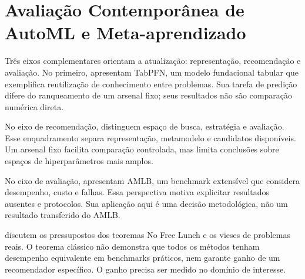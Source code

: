 \section{Avaliação Contemporânea de AutoML e Meta-aprendizado}

Três eixos complementares orientam a atualização: representação, recomendação e avaliação. No primeiro,  apresentam TabPFN, um modelo fundacional tabular que exemplifica reutilização de conhecimento entre problemas. Sua tarefa de predição difere do ranqueamento de um arsenal fixo; seus resultados não são comparação numérica direta.

No eixo de recomendação,  distinguem espaço de busca, estratégia e avaliação. Esse enquadramento separa representação, metamodelo e candidatos disponíveis. Um arsenal fixo facilita comparação controlada, mas limita conclusões sobre espaços de hiperparâmetros mais amplos.

No eixo de avaliação,  apresentam AMLB, um benchmark extensível que considera desempenho, custo e falhas. Essa perspectiva motiva explicitar resultados ausentes e protocolos. Sua aplicação aqui é uma decisão metodológica, não um resultado transferido do AMLB.

 discutem os pressupostos dos teoremas No Free Lunch e os vieses de problemas reais. O teorema clássico não demonstra que todos os métodos tenham desempenho equivalente em benchmarks práticos, nem garante ganho de um recomendador específico. O ganho precisa ser medido no domínio de interesse.
